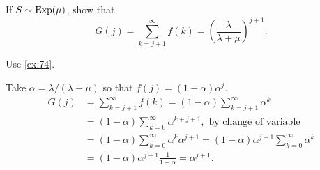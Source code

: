 \begin{exercise}
 If $S\sim \operatorname{Exp}(\mu)$, show that 
  \begin{equation}
G(j) = \sum_{k=j+1}^\infty f(k) =  \left(\frac{\lambda}{\lambda+\mu}\right)^{j+1}.
  \end{equation}
\begin{hint}
    Use \cref{ex:74}.
\end{hint}
\begin{solution}
  Take $\alpha = \lambda/(\lambda+\mu)$ so that
  $f(j) = (1-\alpha) \alpha^j$.
\begin{align*}
  G(j) 
&= \sum_{k=j+1}^\infty f(k)  = (1-\alpha) \sum_{k=j+1}^\infty \alpha^k \\
& = (1-\alpha) \sum_{k=0}^\infty \alpha^{k+j+1}, \text{ by change of variable}\\
& = (1-\alpha) \sum_{k=0}^\infty \alpha^{k}\alpha^{j+1}= (1-\alpha)\alpha^{j+1} \sum_{k=0}^\infty \alpha^k \\
&= (1-\alpha)\alpha^{j+1} \frac{1}{1-\alpha} = \alpha^{j+1}.
\end{align*}
\end{solution}
\end{exercise}

